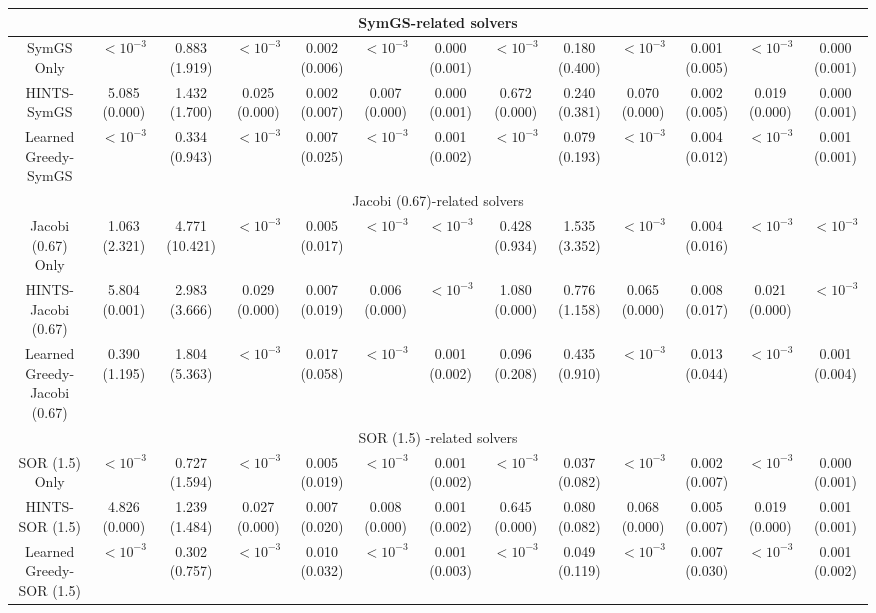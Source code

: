 \documentclass{article}
\begin{document}
\begin{table}[H]
{\begin{tabular}{ccccccccccccc}
 \hline
 \multicolumn{13}{c}{SymGS-related solvers}\\
 \hline
SymGS Only& $<10^{-3}$ & 0.883 (1.919) & $<10^{-3}$ & 0.002 (0.006) & $<10^{-3}$ & 0.000 (0.001) & $<10^{-3}$ & 0.180 (0.400) & $<10^{-3}$ & 0.001 (0.005) & $<10^{-3}$ & 0.000 (0.001) \\
HINTS-SymGS & 5.085 (0.000) & 1.432 (1.700) & 0.025 (0.000) & 0.002 (0.007) & 0.007 (0.000) & 0.000 (0.001) & 0.672 (0.000) & 0.240 (0.381) & 0.070 (0.000) & 0.002 (0.005) & 0.019 (0.000) & 0.000 (0.001) \\
Learned Greedy-SymGS & $<10^{-3}$ & 0.334 (0.943) & $<10^{-3}$ & 0.007 (0.025) & $<10^{-3}$ & 0.001 (0.002) & $<10^{-3}$ & 0.079 (0.193) & $<10^{-3}$ & 0.004 (0.012) & $<10^{-3}$ & 0.001 (0.001) \\
 \hline
 \multicolumn{13}{c}{Jacobi (0.67)-related solvers}\\
 \hline
Jacobi (0.67) Only& 1.063 (2.321) & 4.771 (10.421) & $<10^{-3}$ & 0.005 (0.017) & $<10^{-3}$ & $<10^{-3}$ & 0.428 (0.934) & 1.535 (3.352) & $<10^{-3}$ & 0.004 (0.016) & $<10^{-3}$ & $<10^{-3}$ \\
HINTS-Jacobi (0.67) & 5.804 (0.001) & 2.983 (3.666) & 0.029 (0.000) & 0.007 (0.019) & 0.006 (0.000) & $<10^{-3}$ & 1.080 (0.000) & 0.776 (1.158) & 0.065 (0.000) & 0.008 (0.017) & 0.021 (0.000) & $<10^{-3}$ \\
Learned Greedy-Jacobi (0.67) & 0.390 (1.195) & 1.804 (5.363) & $<10^{-3}$ & 0.017 (0.058) & $<10^{-3}$ & 0.001 (0.002) & 0.096 (0.208) & 0.435 (0.910) & $<10^{-3}$ & 0.013 (0.044) & $<10^{-3}$ & 0.001 (0.004) \\
 \hline
 \multicolumn{13}{c}{SOR (1.5) -related solvers}\\
 \hline
SOR (1.5) Only& $<10^{-3}$ & 0.727 (1.594) & $<10^{-3}$ & 0.005 (0.019) & $<10^{-3}$ & 0.001 (0.002) & $<10^{-3}$ & 0.037 (0.082) & $<10^{-3}$ & 0.002 (0.007) & $<10^{-3}$ & 0.000 (0.001) \\
HINTS-SOR (1.5) & 4.826 (0.000) & 1.239 (1.484) & 0.027 (0.000) & 0.007 (0.020) & 0.008 (0.000) & 0.001 (0.002) & 0.645 (0.000) & 0.080 (0.082) & 0.068 (0.000) & 0.005 (0.007) & 0.019 (0.000) & 0.001 (0.001) \\
Learned Greedy-SOR (1.5) & $<10^{-3}$ & 0.302 (0.757) & $<10^{-3}$ & 0.010 (0.032) & $<10^{-3}$ & 0.001 (0.003) & $<10^{-3}$ & 0.049 (0.119) & $<10^{-3}$ & 0.007 (0.030) & $<10^{-3}$ & 0.001 (0.002) \\
\bottomrule
\hline \hline
\end{tabular}
    }

    \label{tab:modecomparison}
\end{table}
\end{document}
